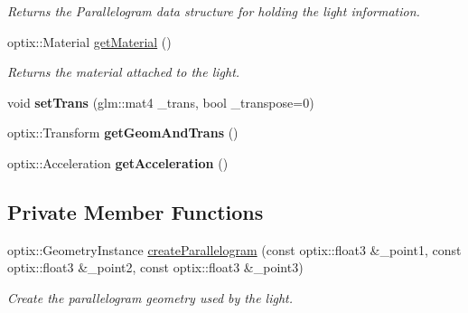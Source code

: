 \begin{DoxyCompactItemize}
\begin{DoxyCompactList}\small\item\em Returns the Parallelogram data structure for holding the light information. \end{DoxyCompactList}\item 
\hypertarget{class_light_a56ae6197fefbc72b1114a696539d9e41}{optix\-::\-Material \hyperlink{class_light_a56ae6197fefbc72b1114a696539d9e41}{get\-Material} ()}\label{class_light_a56ae6197fefbc72b1114a696539d9e41}

\begin{DoxyCompactList}\small\item\em Returns the material attached to the light. \end{DoxyCompactList}\item 
\hypertarget{class_light_a547b5f6bce87bb1afaa310da7e60debd}{void {\bfseries set\-Trans} (glm\-::mat4 \-\_\-trans, bool \-\_\-transpose=0)}\label{class_light_a547b5f6bce87bb1afaa310da7e60debd}

\item 
\hypertarget{class_light_a40b9f2558fab3ad3368eeda329dcd540}{optix\-::\-Transform {\bfseries get\-Geom\-And\-Trans} ()}\label{class_light_a40b9f2558fab3ad3368eeda329dcd540}

\item 
\hypertarget{class_light_aa3dc480efad5296465c3221a0ae5ccb3}{optix\-::\-Acceleration {\bfseries get\-Acceleration} ()}\label{class_light_aa3dc480efad5296465c3221a0ae5ccb3}

\end{DoxyCompactItemize}
\subsection*{Private Member Functions}
\begin{DoxyCompactItemize}
\item 
\hypertarget{class_light_abcc5c13ce90a138c34cd2176414ca796}{optix\-::\-Geometry\-Instance \hyperlink{class_light_abcc5c13ce90a138c34cd2176414ca796}{create\-Parallelogram} (const optix\-::float3 \&\-\_\-point1, const optix\-::float3 \&\-\_\-point2, const optix\-::float3 \&\-\_\-point3)}\label{class_light_abcc5c13ce90a138c34cd2176414ca796}

\begin{DoxyCompactList}\small\item\em Create the parallelogram geometry used by the light. \end{DoxyCompactList}\end{DoxyCompactItemize}
